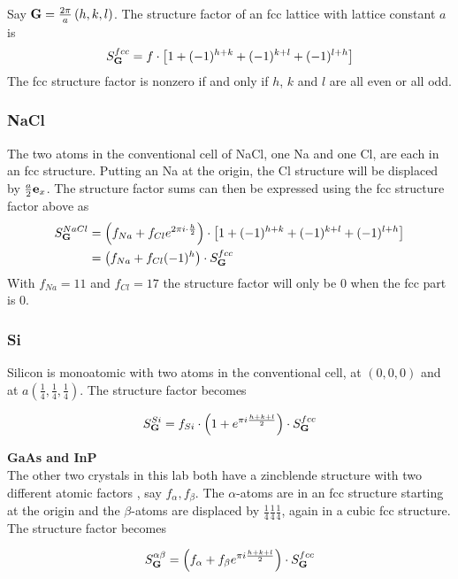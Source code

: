\documentclass[a4paper,twoside=false,abstract=false,numbers=noenddot,
titlepage=false,headings=small,parskip=half,version=last]{scrartcl}
\begin{document}
Say $\bold{G} = \frac{2\pi}{a}\left( h,k,l \right)$. The structure factor of an fcc lattice with lattice constant $a$ is
\begin{equation}
    S^{fcc}_{\bold{G}} = f\cdot \left[ 1 + (-1)^{h+k} + (-1)^{k+l} + (-1)^{l+h}\right]
\end{equation}
The fcc structure factor is nonzero if and only if $h$, $k$ and $l$ are all even or all odd.\\

\subsubsection{NaCl}
The two atoms in the conventional cell of NaCl, one Na and one Cl, are each in an fcc structure.
Putting an Na at the origin, the Cl structure will be displaced by $\frac{a}{2}\bold{e}_x$.
The structure factor sums can then be expressed using the fcc structure factor above as
\begin{align}
    S^{NaCl}_{\bold{G}}
    &= \left( f_{Na} + f_{Cl}e^{2\pi i\cdot \frac{h}{2}} \right) \cdot \left[ 1 + (-1)^{h+k} + (-1)^{k+l} + (-1)^{l+h}\right]\nonumber\\
    &= \left( f_{Na} + f_{Cl}(-1)^{h} \right) \cdot S^{fcc}_{\bold{G}}
\end{align}\label{naclstructure}
With $f_{Na}=11$ and $f_{Cl}=17$ the structure factor will only be $0$ when the fcc part is $0$.

\subsubsection{Si}
Silicon is monoatomic with two atoms in the conventional cell, at $(0,0,0)$ and at $a(\frac{1}{4},\frac{1}{4},\frac{1}{4})$.
The structure factor becomes

\begin{equation}
    \label{eq:sistructure}
    S^{Si}_{\bold{G}}
    = f_{Si}\cdot \left( 1 + e^{\pi i \frac{h+k+l}{2}} \right) \cdot S^{fcc}_{\bold{G}}
\end{equation}

\textbf{GaAs and InP}\\
The other two crystals in this lab both have a zincblende structure with two different atomic factors , say $f_\alpha,f_\beta$.
The $\alpha$-atoms are in an fcc structure starting at the origin and the $\beta$-atoms are displaced by $\frac{1}{4}\frac{1}{4}\frac{1}{4}$, again in a cubic fcc structure.
The structure factor becomes

\begin{equation}
    \label{eq:zincblendestructure}
    S^{\alpha\beta}_{\bold{G}}
    = \left( f_\alpha + f_\beta e^{\pi i \frac{h+k+l}{2}} \right) \cdot S^{fcc}_{\bold{G}}
\end{equation}
\end{document}
